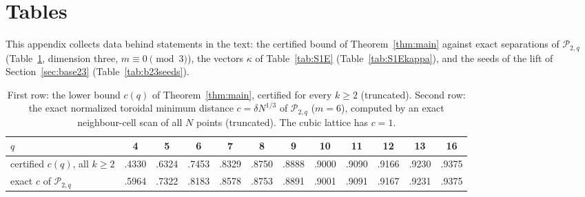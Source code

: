 \documentclass[11pt]{amsart}
\theoremstyle{definition}
\theoremstyle{plain}
\begin{document}
\section{Tables}\label{app:tables}\label{sec:num}
This appendix collects data behind statements in the text: the certified bound of Theorem~\ref{thm:main} against exact separations of $\mathcal P_{2,q}$ (Table~\ref{tab:c}, dimension three, $m\equiv0\pmod3$), the vectors $\kappa$ of Table~\ref{tab:S1E} (Table~\ref{tab:S1Ekappa}), and the seeds of the lift of Section~\ref{sec:base23} (Table~\ref{tab:b23seeds}).
\begin{table}[tbp]
\centering\small\setlength{\tabcolsep}{3.6pt}
\begin{tabular}{@{}lccccccccccc@{}}
\toprule
$q$ & 4 & 5 & 6 & 7 & 8 & 9 & 10 & 11 & 12 & 13 & 16\\
\midrule
certified $c(q)$, all $k\ge2$ & .4330 & .6324 & .7453 & .8329 & .8750 & .8888 & .9000 & .9090 & .9166 & .9230 & .9375\\
exact $c$ of $\mathcal P_{2,q}$ & .5964 & .7322 & .8183 & .8578 & .8753 & .8891 & .9001 & .9091 & .9167 & .9231 & .9375\\
\bottomrule
\end{tabular}
\medskip
\caption{First row: the lower bound $c(q)$ of Theorem~\ref{thm:main}, certified for every $k\ge2$ (truncated). Second row: the exact normalized toroidal minimum distance $c=\delta N^{1/3}$ of $\mathcal P_{2,q}$ ($m=6$), computed by an exact neighbour-cell scan of all $N$ points (truncated). The cubic lattice has $c=1$.}
\label{tab:c}
\end{table}
\end{document}
